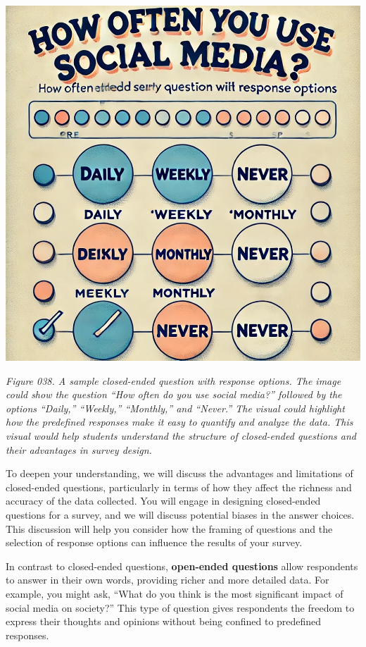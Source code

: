 \documentclass[
]{book}
\begin{document}
\includegraphics[width=1\linewidth,height=\textheight,keepaspectratio]{images/fig038.jpg}

\emph{Figure 038. A sample closed-ended question with response options. The image could show the question ``How often do you use social media?'' followed by the options ``Daily,'' ``Weekly,'' ``Monthly,'' and ``Never.'' The visual could highlight how the predefined responses make it easy to quantify and analyze the data. This visual would help students understand the structure of closed-ended questions and their advantages in survey design.}

To deepen your understanding, we will discuss the advantages and limitations of closed-ended questions, particularly in terms of how they affect the richness and accuracy of the data collected. You will engage in designing closed-ended questions for a survey, and we will discuss potential biases in the answer choices. This discussion will help you consider how the framing of questions and the selection of response options can influence the results of your survey.

In contrast to closed-ended questions, \textbf{open-ended questions} allow respondents to answer in their own words, providing richer and more detailed data. For example, you might ask, ``What do you think is the most significant impact of social media on society?'' This type of question gives respondents the freedom to express their thoughts and opinions without being confined to predefined responses.
\end{document}
